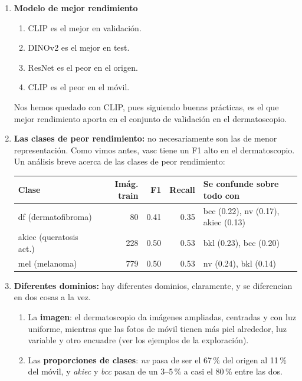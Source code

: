 \documentclass[10pt,a4paper]{article}
\renewcommand{\_}{\guionbajo\allowbreak}
\begin{document}
\begin{enumerate}
    \item \textbf{Modelo de mejor rendimiento}
    \begin{enumerate}
        \item CLIP es el mejor en validación.
        \item DINOv2 es el mejor en test.
        \item ResNet es el peor en el origen.
        \item CLIP es el peor en el móvil.
    \end{enumerate}
    Nos hemos quedado con CLIP, pues siguiendo buenas prácticas, es el que mejor rendimiento aporta en el
    conjunto de validación en el dermatoscopio. 
    \item \textbf{Las clases de peor rendimiento:} no necesariamente son las de menor representación. Como vimos antes, vasc tiene un F1 alto en el dermatoscopio. 
    Un análisis breve acerca de las clases de peor rendimiento: 
    \begin{center}
        \captionsetup{type=table}
    \small
    \renewcommand{\arraystretch}{1.2}
    \begin{tabular}{@{}lrrrl@{}}
        \toprule
        \textbf{Clase} & \textbf{Imág. train} & \textbf{F1} & \textbf{Recall} & \textbf{Se confunde sobre todo con} \\
        \midrule
        df (dermatofibroma)     &  80 & 0.41 & 0.35 & bcc (0.22), nv (0.17), akiec (0.13) \\
        akiec (queratosis act.) & 228 & 0.50 & 0.53 & bkl (0.23), bcc (0.20) \\
        mel (melanoma)          & 779 & 0.50 & 0.53 & nv (0.24), bkl (0.14) \\
        \bottomrule
    \end{tabular}
        \caption{Clases con peor F1 en el test del dermatoscopio y sus principales confusiones.}
        \label{tab:peor-f1-origen}
    \end{center}
    \item \textbf{Diferentes dominios:} hay diferentes dominios, claramente, y se diferencian en dos cosas a la vez. 
    \begin{enumerate}
        \item  La \textbf{imagen}: el dermatoscopio da imágenes ampliadas,
        centradas y con luz uniforme, mientras que las fotos de móvil tienen más piel alrededor, luz variable y otro encuadre
        (ver los ejemplos de la exploración). 
        \item  Las \textbf{proporciones de clases}: \textit{nv} pasa de ser el
    67\,\% del origen al 11\,\% del móvil, y \textit{akiec} y \textit{bcc} pasan de un 3--5\,\% a casi el 80\,\% entre las dos.
    \end{enumerate}


\end{enumerate}
\end{document}
